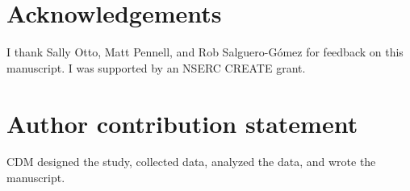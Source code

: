 \documentclass[12pt, oneside]{article}
\begin{document}
\section*{Acknowledgements}
I thank Sally Otto, Matt Pennell, and Rob Salguero-G\'{o}mez for feedback on this manuscript. I was supported by an NSERC CREATE grant.

\section*{Author contribution statement}
CDM designed the study, collected data, analyzed the data, and wrote the manuscript.

\clearpage





\clearpage

\end{document}
